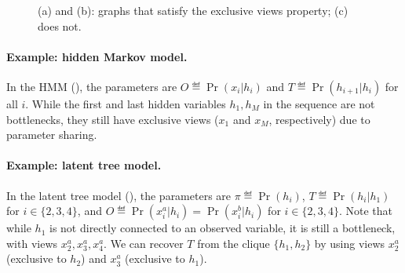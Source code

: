 \begin{figure}
  \centering
  \caption{(a) and (b): graphs that satisfy the exclusive views property; (c) does not.}
  \label{fig:examples}
\end{figure}


\paragraph{Example: hidden Markov model.}

In the HMM (), the parameters
are $O \eqdef \Pr(x_i|h_i)$ and $T \eqdef \Pr(h_{i+1} | h_i)$
for all $i$.
While the first and last hidden variables $h_1, h_M$ in the
  sequence are not bottlenecks, they still have exclusive views ($x_1$ and
  $x_M$, respectively)
  due to parameter sharing.

\paragraph{Example: latent tree model.}

In the latent tree model (), the parameters
are $\pi \eqdef \Pr(h_i)$, $T \eqdef \Pr(h_i | h_1)$ for $i \in \{2,3,4\}$,
and $O \eqdef \Pr(x^a_i | h_i) = \Pr(x^b_i | h_i)$ for $i \in \{2,3,4\}$.
Note that while $h_1$ is not directly connected to an observed variable,
  it is still a bottleneck, with views $x^a_2, x^a_3, x^a_4$.
We can recover $T$ from the clique $\{h_1, h_2\}$ by using views $x^a_2$
  (exclusive to $h_2$) and $x^a_3$ (exclusive to $h_1$).

